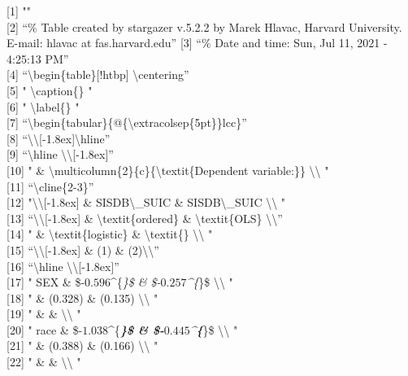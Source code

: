 \documentclass[
]{article}
\begin{document}
{[}1{]} ""\\
{[}2{]} ``\% Table created by stargazer v.5.2.2 by Marek Hlavac, Harvard
University. E-mail: hlavac at fas.harvard.edu'' {[}3{]} ``\% Date and
time: Sun, Jul 11, 2021 - 4:25:13 PM''\\
{[}4{]} ``\textbackslash begin\{table\}{[}!htbp{]}
\textbackslash centering''\\
{[}5{]} " \textbackslash caption\{\} "\\
{[}6{]} " \textbackslash label\{\} "\\
{[}7{]}
``\textbackslash begin\{tabular\}\{@\{\textbackslash extracolsep\{5pt\}\}lcc\}''\\
{[}8{]}
``\textbackslash\textbackslash{[}-1.8ex{]}\textbackslash hline''\\
{[}9{]} ``\textbackslash hline
\textbackslash\textbackslash{[}-1.8ex{]}''\\
{[}10{]} " \&
\textbackslash multicolumn\{2\}\{c\}\{\textbackslash textit\{Dependent
variable:\}\} \textbackslash\textbackslash{} "\\
{[}11{]} ``\textbackslash cline\{2-3\}''\\
{[}12{]} "\textbackslash\textbackslash{[}-1.8ex{]} \&
SISDB\textbackslash\_SUIC \& SISDB\textbackslash\_SUIC
\textbackslash\textbackslash{} "\\
{[}13{]} ``\textbackslash\textbackslash{[}-1.8ex{]} \&
\textbackslash textit\{ordered\} \& \textbackslash textit\{OLS\}
\textbackslash\textbackslash{}''\\
{[}14{]} " \& \textbackslash textit\{logistic\} \&
\textbackslash textit\{\} \textbackslash\textbackslash{} "\\
{[}15{]} ``\textbackslash\textbackslash{[}-1.8ex{]} \& (1) \&
(2)\textbackslash\textbackslash{}''\\
{[}16{]} ``\textbackslash hline
\textbackslash\textbackslash{[}-1.8ex{]}''\\
{[}17{]} " SEX \& \$-\(0.596\)\^{}\{\emph{\}\$ \&
\$-\(0.257\)\^{}\{}\}\$ \textbackslash\textbackslash{} "\\
{[}18{]} " \& (0.328) \& (0.135) \textbackslash\textbackslash{} "\\
{[}19{]} " \& \& \textbackslash\textbackslash{} "\\
{[}20{]} " race \& \$-\(1.038\)\^{}\{\textbf{\emph{\}\$ \&
\$-\(0.445\)\^{}\{}}\}\$ \textbackslash\textbackslash{} "\\
{[}21{]} " \& (0.388) \& (0.166) \textbackslash\textbackslash{} "\\
{[}22{]} " \& \& \textbackslash\textbackslash{} "\\
\end{document}
